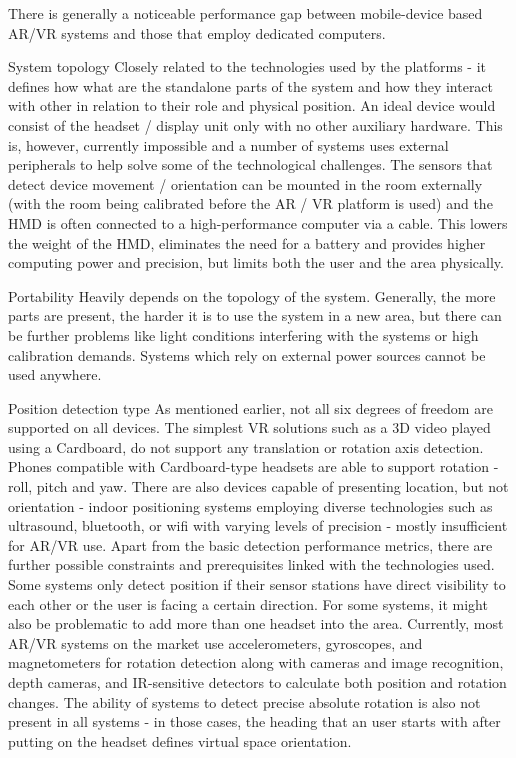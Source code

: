 \documentclass[12pt, a4paper]{article}
\newenvironment{definitions}
{\begin{description}[style=nextline]}
{\end{description}}
\begin{document}
\begin{definitions}
There is generally a noticeable performance gap between mobile-device based AR/VR systems and those that employ dedicated computers.
\item[System topology] Closely related to the technologies used by the platforms - it defines how what are the standalone parts of the system and how they interact with other in relation to their role and physical position. An ideal device would consist of the headset / display unit only with no other auxiliary hardware. This is, however, currently impossible and a number of systems uses external peripherals to help solve some of the technological challenges. The sensors that detect device movement / orientation can be mounted in the room externally (with the room being calibrated before the AR / VR platform is used) and the HMD is often connected to a high-performance computer via a cable. This lowers the weight of the HMD, eliminates the need for a battery and provides higher computing power and precision, but limits both the user and the area physically.
\item[Portability] Heavily depends on the topology of the system. Generally, the more parts are present, the harder it is to use the system in a new area, but there can be further problems like light conditions interfering with the systems or high calibration demands. Systems which rely on external power sources cannot be used anywhere.
\item[Position detection type] As mentioned earlier, not all six degrees of freedom are supported on all devices. The simplest VR solutions such as a 3D video played using a Cardboard, do not support any translation or rotation axis detection. Phones compatible with Cardboard-type headsets are able to support rotation - roll, pitch and yaw. There are also devices capable of presenting location, but not orientation - indoor positioning systems employing diverse technologies such as ultrasound, bluetooth, or wifi with varying levels of precision - mostly insufficient for AR/VR use. Apart from the basic detection performance metrics, there are further possible constraints and prerequisites linked with the technologies used. Some systems only detect position if their sensor stations have direct visibility to each other or the user is facing a certain direction. For some systems, it might also be problematic to add more than one headset into the area. Currently, most AR/VR systems on the market use accelerometers, gyroscopes, and magnetometers for rotation detection along with cameras and image recognition, depth cameras, and IR-sensitive detectors to calculate both position and rotation changes. The ability of systems to detect precise absolute rotation is also not present in all systems - in those cases, the heading that an user starts with after putting on the headset defines virtual space orientation.


\end{definitions}
\end{document}
